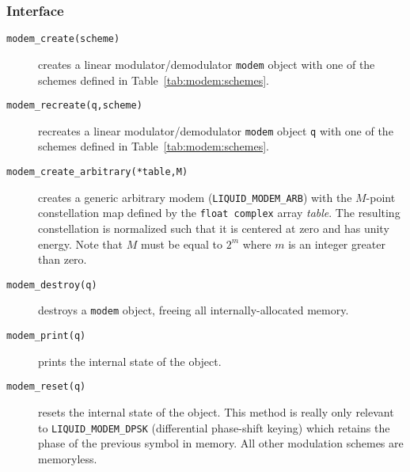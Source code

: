 \subsubsection{Interface}
\label{module:modem:digital:interface}
\begin{description}
\item[{\tt modem\_create(scheme)}]
    creates a linear modulator/demodulator {\tt modem} object with one
    of the schemes defined in Table~\ref{tab:modem:schemes}.
\item[{\tt modem\_recreate(q,scheme)}]
    recreates a linear modulator/demodulator {\tt modem} object {\tt q}
    with one of the schemes defined in Table~\ref{tab:modem:schemes}.
\item[{\tt modem\_create\_arbitrary(*table,M)}]
    creates a generic arbitrary modem ({\tt LIQUID\_MODEM\_ARB}) with
    the $M$-point constellation map defined by the {\tt float complex}
    array {\em table}.
    The resulting constellation is normalized such that it is centered
    at zero and has unity energy.
    Note that $M$ must be equal to $2^m$ where $m$ is an integer greater
    than zero.
\item[{\tt modem\_destroy(q)}]
    destroys a {\tt modem} object, freeing all internally-allocated
    memory.
\item[{\tt modem\_print(q)}]
    prints the internal state of the object.
\item[{\tt modem\_reset(q)}]
    resets the internal state of the object.
    This method is really only relevant to {\tt LIQUID\_MODEM\_DPSK}
    (differential phase-shift keying) which retains the phase of the
    previous symbol in memory.
    All other modulation schemes are memoryless.

\end{description}
